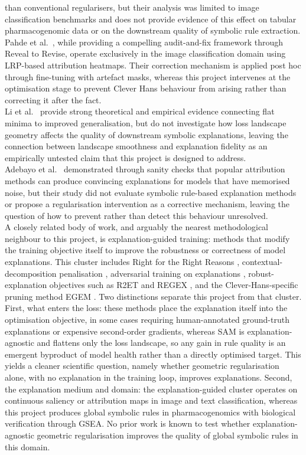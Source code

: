 than conventional regularisers, but their analysis was limited to image classification benchmarks and
does not provide evidence of this effect on tabular pharmacogenomic data or on the downstream quality
of symbolic rule extraction.
\\
Pahde et al.~\cite{Pahde2023}, while providing a compelling audit-and-fix framework through Reveal to
Revise, operate exclusively in the image classification domain using LRP-based attribution heatmaps.
Their correction mechanism is applied post hoc through fine-tuning with artefact masks, whereas this
project intervenes at the optimisation stage to prevent Clever Hans behaviour from arising rather than
correcting it after the fact.
\\
Li et al.~\cite{Li2018} provide strong theoretical and empirical evidence connecting flat minima to
improved generalisation, but do not investigate how loss landscape geometry affects the quality of
downstream symbolic explanations, leaving the connection between landscape smoothness and explanation
fidelity as an empirically untested claim that this project is designed to address.
\\
Adebayo et al.~\cite{Adebayo2018} demonstrated through sanity checks that popular attribution methods
can produce convincing explanations for models that have memorised noise, but their study did not
evaluate symbolic rule-based explanation methods or propose a regularisation intervention as a
corrective mechanism, leaving the question of how to prevent rather than detect this behaviour
unresolved.
\\
A closely related body of work, and arguably the nearest methodological neighbour to this project, is
explanation-guided training: methods that modify the training objective itself to improve the
robustness or correctness of model explanations. This cluster includes Right for the Right Reasons
\cite{Ross2017}, contextual-decomposition penalisation \cite{Rieger2020}, adversarial training on
explanations \cite{Tang2022}, robust-explanation objectives such as R2ET \cite{Chen2022} and REGEX
\cite{Li2023}, and the Clever-Hans-specific pruning method EGEM \cite{Linhardt2024}. Two distinctions
separate this project from that cluster. First, what enters the loss: these methods place the
explanation itself into the optimisation objective, in some cases requiring human-annotated
ground-truth explanations \cite{Ross2017} or expensive second-order gradients, whereas SAM is
explanation-agnostic and flattens only the loss landscape, so any gain in rule quality is an emergent
byproduct of model health rather than a directly optimised target. This yields a cleaner scientific
question, namely whether geometric regularisation alone, with no explanation in the training loop,
improves explanations. Second, the explanation medium and domain: the explanation-guided cluster
operates on continuous saliency or attribution maps in image and text classification, whereas this
project produces global symbolic rules in pharmacogenomics with biological verification through GSEA.
No prior work is known to test whether explanation-agnostic geometric regularisation improves the
quality of global symbolic rules in this domain.

